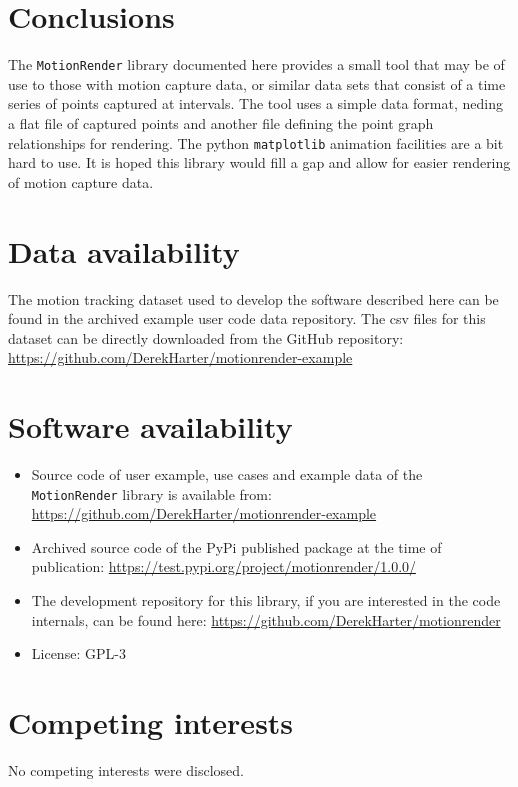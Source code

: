 \documentclass[10pt,a4paper]{article}
\begin{document}
\section*{Conclusions} %
The \verb|MotionRender| library documented here provides a small tool
that may be of use to those with motion capture data, or similar data
sets that consist of a time series of points captured at intervals.
The tool uses a simple data format, neding a flat file of captured
points and another file defining the point graph relationships for
rendering.  The python \verb|matplotlib| animation facilities are a
bit hard to use.  It is hoped this library would fill a gap and allow
for easier rendering of motion capture data.


\section*{Data availability} %

The motion tracking dataset used to develop the software described here can be
found in the archived example user code data repository.  The csv files for this dataset
can be directly downloaded from the GitHub repository:
\url{https://github.com/DerekHarter/motionrender-example}

\section*{Software availability}

\begin{itemize}
        \item Source code of user example, use cases and example data
          of the \verb|MotionRender| library is available
          from: \url{https://github.com/DerekHarter/motionrender-example}
	\item Archived source code of the PyPi published package
          at the time of publication: \url{https://test.pypi.org/project/motionrender/1.0.0/}
        \item The development repository for this library, if you are interested in the
          code internals, can be found here:
          \url{https://github.com/DerekHarter/motionrender}
	\item License: GPL-3
\end{itemize}

\section*{Competing interests}
No competing interests were disclosed.
\end{document}
